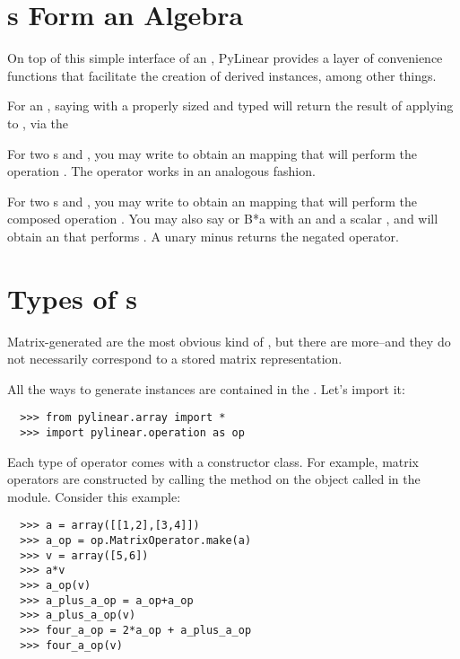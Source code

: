 \section{s Form an Algebra}

On top of this simple interface of an , PyLinear 
provides a layer of convenience functions that facilitate the
creation of derived instances, among other things.

\opindex{()}For an  , saying 
with a properly sized and typed   will
return the result of applying  to , via the

\opindex{+}For two s  and , you may write
 to obtain an  mapping that will
perform the operation . The operator \code{-} works
in an analogous fashion.

\opindex{*}For two s  and , you may
write  to obtain an  mapping that will
perform the composed operation . You may also say
 or {B*a} with an   and a scalar
, and will obtain an  that performs
. A unary minus  returns the negated
operator.

\section{Types of s}

Matrix-generated are the most obvious kind of , but 
there are more--and they do not necessarily correspond to a stored
matrix representation.

All the ways to generate  instances are contained 
in the . Let's import it:
\begin{verbatim}
  >>> from pylinear.array import *
  >>> import pylinear.operation as op
\end{verbatim}

Each type of operator comes with a constructor class. For example,
matrix operators are constructed by calling the method 
on the object called  in the  
module. Consider this example:
\begin{verbatim}
  >>> a = array([[1,2],[3,4]])
  >>> a_op = op.MatrixOperator.make(a)
  >>> v = array([5,6])
  >>> a*v
  >>> a_op(v)
  >>> a_plus_a_op = a_op+a_op
  >>> a_plus_a_op(v)
  >>> four_a_op = 2*a_op + a_plus_a_op
  >>> four_a_op(v)
\end{verbatim}

